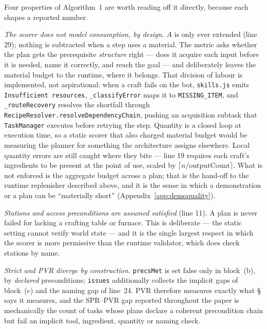 \documentclass[letterpaper]{article} %
\newcommand{\appref}[1]{Appendix~\ref{#1}}
\newcommand{\bodyref}[1]{\getrefnumber{#1}}
\begin{document}
Four properties of Algorithm~1 are worth reading off it directly,
because each shapes a reported number.

\emph{The scorer does not model consumption, by design.}  $A$ is only
ever extended (line 29); nothing is subtracted when a step uses a
material.  The metric asks whether the plan gets the prerequisite
\emph{structure} right --- does it acquire each input before it is
needed, name it correctly, and reach the goal --- and deliberately
leaves the material budget to the runtime, where it belongs.  That
division of labour is implemented, not aspirational: when a craft
fails on the bot, \texttt{skills.js} emits
\texttt{Insufficient resources}, \texttt{\_classifyError} maps it to
\texttt{MISSING\_ITEM}, and \texttt{\_routeRecovery} resolves the
shortfall through \texttt{RecipeResolver.resolveDependencyChain},
pushing an acquisition subtask that \texttt{TaskManager} executes
before retrying the step.  Quantity is a closed loop at execution
time, so a static scorer that also charged material budget would be
measuring the planner for something the architecture assigns
elsewhere.  Local quantity errors are still caught where they bite ---
line 19 requires each craft's ingredients to be present at the point of
use, scaled by $\lceil n/\text{outputCount}\rceil$.  What is not
enforced is the aggregate budget across a plan; that is the hand-off to
the runtime replenisher described above, and it is the sense in which a
demonstration or a plan can be ``materially short''
(\appref{app:demoquality}).

\emph{Stations and access preconditions are assumed satisfied}
(line 11).  A plan is never failed for lacking a crafting table or
furnace.  This is deliberate --- the static setting cannot verify
world state --- and it is the single largest respect in which the
scorer is more permissive than the runtime validator, which does check
stations by name.

\emph{Strict and PVR diverge by construction.}  \texttt{precsMet} is
set false only in block~(b), by \emph{declared} preconditions;
\texttt{issues} additionally collects the implicit gaps of block~(c)
and the naming gap of line~24.  PVR therefore measures exactly what
\S\bodyref{sec:protocol} says it measures, and the SPR--PVR gap reported throughout the
paper is mechanically the count of tasks whose plans declare a
coherent precondition chain but fail an implicit tool, ingredient,
quantity or naming check.
\end{document}

